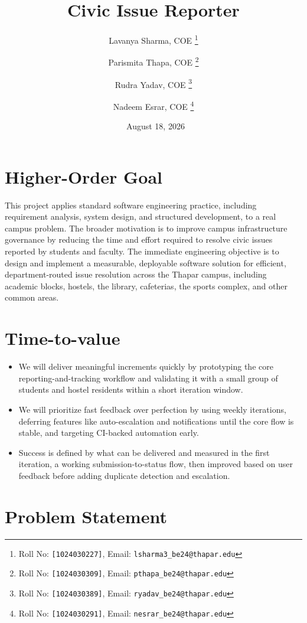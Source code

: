 \documentclass[11pt,a4paper]{article}
\title{Civic Issue Reporter}
\author{%
  Lavanya Sharma, COE%
    \thanks{Roll No: \texttt{[1024030227]}, Email: \texttt{lsharma3\_be24@thapar.edu}}
  \and
  Parismita Thapa, COE%
    \thanks{Roll No: \texttt{[1024030309]}, Email: \texttt{pthapa\_be24@thapar.edu}}
  \and
  Rudra Yadav, COE%
    \thanks{Roll No: \texttt{[1024030389]}, Email: \texttt{ryadav\_be24@thapar.edu}}
  \and
  Nadeem Esrar, COE%
    \thanks{Roll No: \texttt{[1024030291]}, Email: \texttt{nesrar\_be24@thapar.edu}}
}
\date{\ August 18, 2026}
\begin{document}
\maketitle



\section{Higher-Order Goal}

This project applies standard software engineering practice, including
requirement analysis, system design, and structured development, to a real
campus problem. The broader motivation is to improve campus infrastructure
governance by reducing the time and effort required to resolve civic
issues reported by students and faculty. The immediate engineering
objective is to design and implement a measurable, deployable software
solution for efficient, department-routed issue resolution across the
Thapar campus, including academic blocks, hostels, the library,
cafeterias, the sports complex, and other common areas.



\section{Time-to-value}

\begin{itemize}[leftmargin=0.7cm]
  \item We will deliver meaningful increments quickly by prototyping the
    core reporting-and-tracking workflow and validating it with a small
    group of students and hostel residents within a short iteration
    window.
  \item We will prioritize fast feedback over perfection by using weekly
    iterations, deferring features like auto-escalation and notifications
    until the core flow is stable, and targeting CI-backed automation
    early.
  \item Success is defined by what can be delivered and measured in the
    first iteration, a working submission-to-status flow, then improved
    based on user feedback before adding duplicate detection and
    escalation.
\end{itemize}



\section{Problem Statement}
\end{document}

